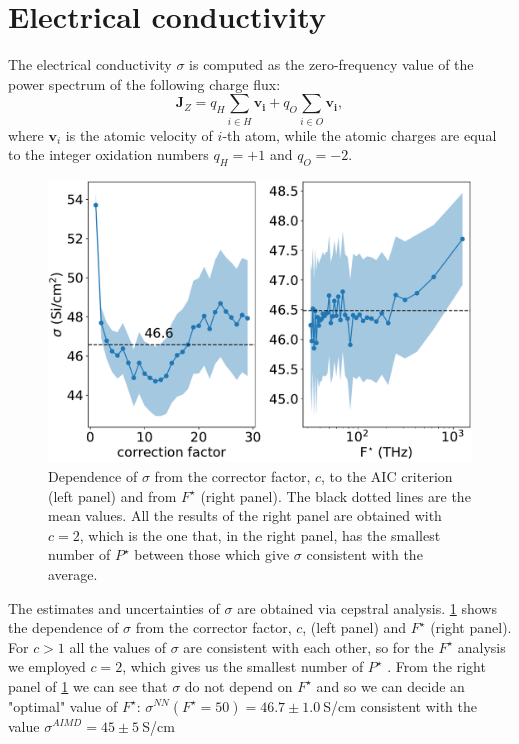 \documentclass[%
 reprint,
 amsmath,amssymb,
 aps,
prb,
]{revtex4-2}
\begin{document}
\section{Electrical conductivity }\label{sec:El_cond}
The electrical conductivity $\sigma$ is computed as the zero-frequency value of the power spectrum of the following charge flux:
\begin{equation}
\mathbf{J}_Z = q_H \sum_{i \in H}\mathbf{v_i} + q_O \sum_{i \in O}\mathbf{v_i},
\end{equation}
where $\mathbf{v}_i$ is the atomic velocity of $i$-th atom, while the atomic charges are equal to the integer oxidation numbers $q_H = +1$ and $q_O = -2$.


\begin{figure}[tbh]
    \centering
    \includegraphics[width=\linewidth]{figs/sigma.pdf}
    \caption{Dependence of $\sigma$ from the corrector factor, $c$, to the AIC criterion (left panel) and from $F^{\star}$ (right panel). The black dotted lines are the mean values. All the results of the right panel are obtained with  $c=2$, which is the one that, in the right panel, has the smallest number of $P^{\star}$ between those which give $\sigma$ consistent with the average. }
    \label{fig:sigma}
\end{figure}

The estimates and uncertainties of $\sigma$ are obtained via cepstral analysis. \cref{fig:sigma} shows the dependence of $\sigma$ from the corrector factor, $c$, (left panel) and $F^{\star}$ (right panel). For $c > 1$ all the values of $\sigma$ are consistent with each other, so for the $F^{\star}$ analysis we employed $c=2$, which gives us the smallest number of $P^{\star}$ .
From the right panel of \cref{fig:sigma} we can see that $\sigma$ do not depend on $F^{\star}$ and so we can decide an "optimal" value of $F^{\star}$: $\sigma^{NN}(F^{\star}=50)=46.7 \pm  1.0 ~$S/cm consistent with the \ai value $\sigma^{AIMD}=45 \pm  5 ~$S/cm
\end{document}
